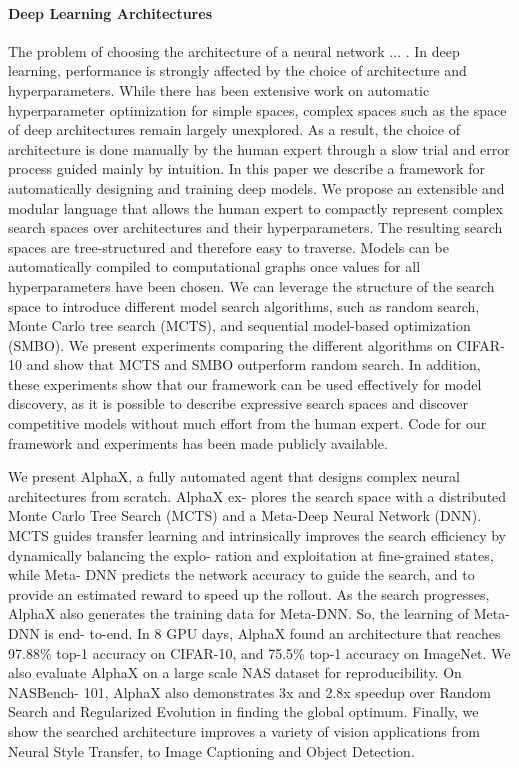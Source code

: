 \paragraph{Deep Learning Architectures}
The problem of choosing the architecture of a neural network ... \cite{negrinho2017deeparchitect}.
In deep learning, performance is strongly affected by the choice of architecture and hyperparameters. While there has been extensive work on automatic hyperparameter optimization for simple spaces, complex spaces such as the space of deep architectures remain largely unexplored. As a result, the choice of architecture is done manually by the human expert through a slow trial and error process guided mainly by intuition. In this paper we describe a framework for automatically designing and training deep models. We propose an extensible and modular language that allows the human expert to compactly represent complex search spaces over architectures and their hyperparameters. The resulting search spaces are tree-structured and therefore easy to traverse. Models can be automatically compiled to computational graphs once values for all hyperparameters have been chosen. We can leverage the structure of the search space to introduce different model search algorithms, such as random search, Monte Carlo tree search (MCTS), and sequential model-based optimization (SMBO). We present experiments comparing the different algorithms on CIFAR-10 and show that MCTS and SMBO outperform random search. In addition, these experiments show that our framework can be used effectively for model discovery, as it is possible to describe expressive search spaces and discover competitive models without much effort from the human expert. Code for our framework and experiments has been made publicly available.
\cite{wang2019alphax}


We present AlphaX, a fully automated agent that designs complex neural architectures from scratch. AlphaX ex- plores the search space with a distributed Monte Carlo Tree Search (MCTS) and a Meta-Deep Neural Network (DNN). MCTS guides transfer learning and intrinsically improves the search efficiency by dynamically balancing the explo- ration and exploitation at fine-grained states, while Meta- DNN predicts the network accuracy to guide the search, and to provide an estimated reward to speed up the rollout. As the search progresses, AlphaX also generates the training data for Meta-DNN. So, the learning of Meta-DNN is end- to-end. In 8 GPU days, AlphaX found an architecture that reaches 97.88\% top-1 accuracy on CIFAR-10, and 75.5\% top-1 accuracy on ImageNet. We also evaluate AlphaX on a large scale NAS dataset for reproducibility. On NASBench- 101, AlphaX also demonstrates 3x and 2.8x speedup over Random Search and Regularized Evolution in finding the global optimum. Finally, we show the searched architecture improves a variety of vision applications from Neural Style Transfer, to Image Captioning and Object Detection.

